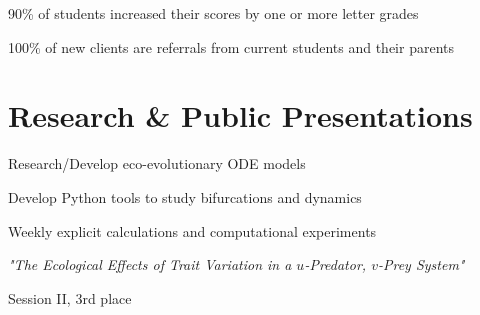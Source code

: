 \documentclass[letterpaper]{deedy-resume} %
\begin{document}
\begin{minipage}[t]{0.66\textwidth}
\sectionspace %



\begin{tightitemize}
\item 90\% of students increased their scores by one or more letter grades
\item 100\% of new clients are referrals from current students and their parents
\end{tightitemize}

\sectionspace %

\section{Research \& Public Presentations}


\begin{tightitemize}
\item Research/Develop eco-evolutionary ODE models
\item Develop Python tools to study bifurcations and dynamics
\item Weekly explicit calculations and computational experiments
\end{tightitemize}
\sectionspace %



{\it "The Ecological Effects of Trait Variation in a $u$-Predator, $v$-Prey System"}
\begin{tightitemize}
\item Session II, 3rd place
\end{tightitemize}
\sectionspace




\end{minipage}
\end{document}
